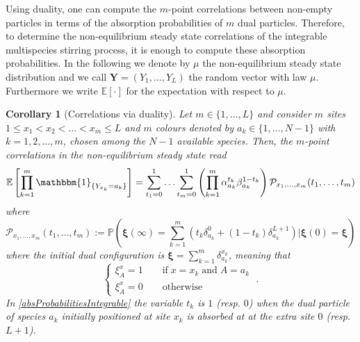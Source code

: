 \documentclass[10pt]{article}
\numberwithin{equation}{section}
\numberwithin{equation}{subsection}
\newtheorem{corollary}{Corollary}
\newcommand{\dt}{\;.}
\begin{document}
Using duality, one can compute the  $m$-point correlations between non-empty particles in terms of the absorption probabilities of $m$ dual particles. Therefore, to determine the non-equilibrium steady state correlations of the integrable multispecies stirring process, it is enough to compute these absorption probabilities. In the following we denote by $\mu$ the non-equilibrium steady state distribution and we call $\bm{Y} = (Y_1,\ldots,Y_L)$ the random vector with law $\mu$. 
Furthermore we write $\mathbb{E}[\cdot]$ for the expectation with respect to $\mu$.%
\begin{corollary}[Correlations via duality]\label{Corolollary-ABS_Corr-abstract}
Let $m\in \{1,\ldots,L\}$ and consider $m$ sites $1 \le x_{1} < x_2 < \ldots < x_m \le L $ and
{$m$ colours denoted by $a_{k}\in\{1,\ldots,N-1\}$  with $k=1,2,\ldots, m$, chosen among the $N-1$ available species.} Then, the $m$-point correlations in the non-equilibrium steady state read 
\begin{equation}\label{NESS-expectation-ABS}
\mathbb{E}\left[\prod_{k=1}^{m}\mathbbm{1}_{\{Y_{x_{k}}=a_{k}\}}\right]=\sum_{t_{1}=0}^{1}\ldots \sum_{t_{m}=0}^{1}\left(\prod_{k=1}^{m}\alpha_{a_{k}}^{t_{k}}\beta_{a_{k}}^{1-t_{k}}\right)\mathcal{P}_{x_1,\ldots,x_m}(t_{1},\ldots,t_{m})
\end{equation}
where
\begin{equation}\label{absProbabilitiesIntegrable}
	\mathcal{P}_{x_1,\ldots,x_m}(t_{1},\ldots,t_{m}):=\mathbb{P}\left(\bm{\xi}(\infty)=\sum_{k=1}^{m}\left(t_{k}\delta^{0}_{a_k}+(1-t_{k})\delta^{L+1}_{a_k}\right)\Big| \bm{\xi}(0)=\bm{\xi}\right)
\end{equation}
where the initial dual configuration is $\bm{\xi}=\sum_{k=1}^{m}\delta_{a_{k}}^{x_{k}}$, meaning that 
\begin{equation}
\label{xsi-init}
	\begin{cases}
		\xi_{A}^{x}=1\qquad \text{if}\;x=x_{k}\;\text{and}\; A=a_{k}\\
		\xi_{A}^{x}=0\qquad \text{otherwise}
	\end{cases}\dt
\end{equation}
In \eqref{absProbabilitiesIntegrable} the variable $t_k$ is $1$ (resp. $0$) when the dual particle of species $a_k$ initially positioned at site $x_{k}$ is absorbed at at the extra site $0$ (resp. $L+1$).
\end{corollary}
\end{document}
